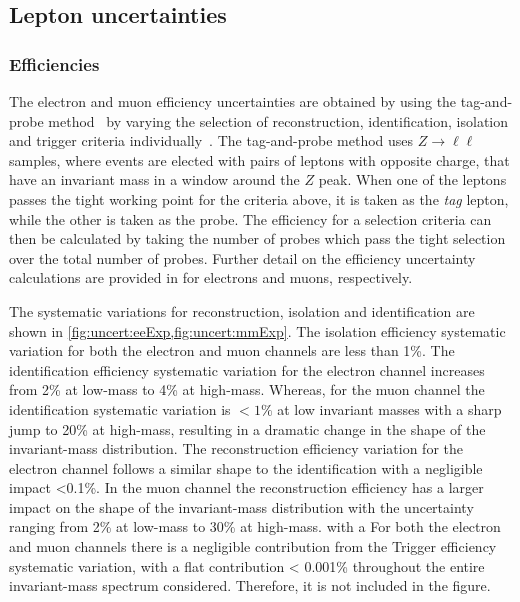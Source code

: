 \subsection{Lepton uncertainties}

\subsubsection{Efficiencies}
The electron and muon efficiency uncertainties are obtained by using the tag-and-probe method~\cite{Aaboud:2016vfy,Aad:2016jkr} by varying the selection of reconstruction, identification, isolation and trigger criteria individually~\cite{Aad:2019tso,Aad:2016jkr}. The tag-and-probe method uses $Z\rightarrow \ell\ell$ samples, where events are elected with pairs of leptons with opposite charge, that have an invariant mass in a window around the $Z$ peak. When one of the leptons passes the tight working point for the criteria above, it is taken as the \emph{tag} lepton, while the other is taken as the probe. The efficiency for a selection criteria can then be calculated by taking the number of probes which pass the tight selection over the total number of probes. Further detail on the efficiency uncertainty calculations are provided in \cite{Aad:2019tso,Aad:2016jkr} for electrons and muons, respectively. 

The systematic variations for reconstruction, isolation and identification are shown in \cref{fig:uncert:eeExp,fig:uncert:mmExp}. The isolation efficiency systematic variation for both the electron and muon channels are less than 1\%. The identification efficiency systematic variation for the electron channel increases from 2\% at low-mass to 4\% at high-mass. Whereas, for the muon channel the identification systematic variation is $< 1\%$ at low invariant masses with a sharp jump to 20\% at high-mass, resulting in a dramatic change in the shape of the invariant-mass distribution. The reconstruction efficiency variation for the electron channel follows a similar shape to the identification with a negligible impact <0.1\%. In the muon channel the reconstruction efficiency has a larger impact on the shape of the invariant-mass distribution with the uncertainty ranging from 2\% at low-mass to 30\% at high-mass. with a For both the electron and muon channels there is a negligible contribution from the Trigger efficiency systematic variation, with a flat contribution < 0.001\% throughout the entire invariant-mass spectrum considered. Therefore, it is not included in the figure. 

